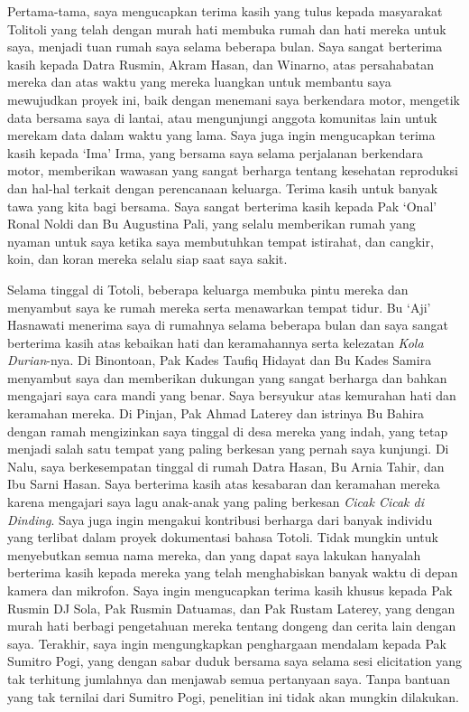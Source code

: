 Pertama-tama, saya mengucapkan terima kasih yang tulus kepada masyarakat Tolitoli yang telah dengan murah hati membuka rumah dan hati mereka untuk saya, menjadi tuan rumah saya selama beberapa bulan. Saya sangat berterima kasih kepada Datra Rusmin, Akram Hasan, dan Winarno, atas persahabatan mereka dan atas waktu yang mereka luangkan untuk membantu saya mewujudkan proyek ini, baik dengan menemani saya berkendara motor, mengetik data bersama saya di lantai, atau mengunjungi anggota komunitas lain untuk merekam data dalam waktu yang lama. Saya juga ingin mengucapkan terima kasih kepada `Ima' Irma, yang bersama saya selama perjalanan berkendara motor, memberikan wawasan yang sangat berharga tentang kesehatan reproduksi dan hal-hal terkait dengan perencanaan keluarga. Terima kasih untuk banyak tawa yang kita bagi bersama. Saya sangat berterima kasih kepada Pak `Onal' Ronal Noldi dan Bu Augustina Pali, yang selalu memberikan rumah yang nyaman untuk saya ketika saya membutuhkan tempat istirahat, dan cangkir, koin, dan koran mereka selalu siap saat saya sakit.	

Selama tinggal di Totoli, beberapa keluarga membuka pintu mereka dan menyambut saya ke rumah mereka serta menawarkan tempat tidur. Bu `Aji' Hasnawati menerima saya di rumahnya selama beberapa bulan dan saya sangat berterima kasih atas kebaikan hati dan keramahannya serta kelezatan \textit{Kola Durian}-nya. Di Binontoan, Pak Kades Taufiq Hidayat dan Bu Kades Samira menyambut saya dan memberikan dukungan yang sangat berharga dan bahkan mengajari saya cara mandi yang benar. Saya bersyukur atas kemurahan hati dan keramahan mereka. Di Pinjan, Pak Ahmad Laterey dan istrinya Bu Bahira dengan ramah mengizinkan saya tinggal di desa mereka yang indah, yang tetap menjadi salah satu tempat yang paling berkesan yang pernah saya kunjungi. Di Nalu, saya berkesempatan tinggal di rumah Datra Hasan,  Bu Arnia Tahir, dan Ibu Sarni Hasan. Saya berterima kasih atas kesabaran dan keramahan mereka karena mengajari saya lagu anak-anak yang paling berkesan \textit{Cicak Cicak di Dinding}. Saya juga ingin mengakui kontribusi berharga dari banyak individu yang terlibat dalam proyek dokumentasi bahasa Totoli. Tidak mungkin untuk menyebutkan semua nama mereka, dan yang dapat saya lakukan hanyalah berterima kasih kepada mereka yang telah menghabiskan banyak waktu di depan kamera dan mikrofon. Saya ingin mengucapkan terima kasih khusus kepada Pak Rusmin DJ Sola, Pak Rusmin Datuamas, dan Pak Rustam Laterey, yang dengan murah hati berbagi pengetahuan mereka tentang dongeng dan cerita lain dengan saya. Terakhir, saya ingin mengungkapkan penghargaan mendalam kepada Pak Sumitro Pogi, yang dengan sabar duduk bersama saya selama sesi elicitation yang tak terhitung jumlahnya dan menjawab semua pertanyaan saya. Tanpa bantuan yang tak ternilai dari Sumitro Pogi, penelitian ini tidak akan mungkin dilakukan.







